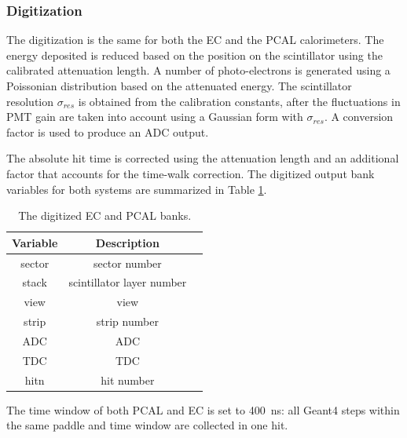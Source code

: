 \subsubsection{Digitization}
The digitization is the same for both the EC and the PCAL calorimeters.
The energy deposited is reduced based on the position on the scintillator using the calibrated attenuation length.
A number of photo-electrons is generated using a Poissonian distribution based on the attenuated energy.
The scintillator resolution $\sigma_{res}$ is obtained from the calibration constants, after the fluctuations in PMT gain
are taken into account using a Gaussian form with $\sigma_{res}$. A conversion factor is used to produce an ADC output.

The absolute hit time is corrected using the attenuation length and an additional factor that accounts for the time-walk correction.
The digitized output bank variables for both systems are summarized in Table \ref{tab:ecBank}.

\begin{table}[h]
	\begin{center}
		\begin{tabular}{| c | c | c |}
			\hline \hline
			Variable &                Description   \\
			\hline
             sector  &              sector number   \\
              stack  &  scintillator layer number   \\
               view  &                       view   \\
              strip  &               strip number   \\
                ADC  &                        ADC   \\
                TDC  &                        TDC   \\
               hitn  &                 hit number   \\
			\hline \hline
		\end{tabular}
	\end{center}
	\caption{The digitized EC and PCAL banks.}\label{tab:ecBank}
\end{table}


The time window of both PCAL and EC is set to 400~ns: all Geant4 steps within the same paddle and time window are collected in one hit.
